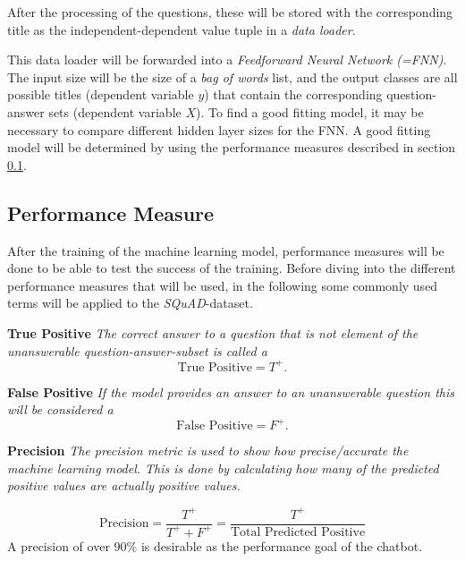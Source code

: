         After the processing of the questions, these will be stored with the corresponding title as the independent-dependent value tuple in a \emph{data loader}.

        This data loader will be forwarded into a \emph{Feedforward Neural Network (=FNN)}.
        The input size will be the size of a \emph{bag of words} list, and the output classes are all possible titles (dependent variable $y$) that contain the corresponding question-answer sets (dependent variable $X$). 
        To find a good fitting model, it may be necessary to compare different hidden layer sizes for the FNN.
        A good fitting model will be determined by using the performance measures described in section \ref{subsec:-the-learning-task---performance-measure}.


        
        
    \subsection{Performance Measure}
    \label{subsec:-the-learning-task---performance-measure}
    
        After the training of the machine learning model, performance measures will be done to be able to test the success of the training.
        Before diving into the different performance measures that will be used, in the following some commonly used terms will be applied to the \emph{SQuAD}-dataset.
        
        \begin{tcolorbox}
            \textbf{True Positive}
            \textit{The correct answer to a question that is not element of the unanswerable question-answer-subset is called a}
            $$\text{True Positive} = T^+.$$
        \end{tcolorbox}

        \begin{tcolorbox}
            \textbf{False Positive}
            \textit{If the model provides an answer to an unanswerable question this will be considered a}
            $$\text{False Positive} = F^+.$$
        \end{tcolorbox}

        \begin{tcolorbox}
            \textbf{Precision}
            \textit{The precision metric is used to show how precise/accurate the machine learning model. 
                This is done by calculating how many of the predicted positive values are actually positive values.
            }

            $$\text{Precision} = \frac{T^+}{T^+ + F^+} = \frac{T^+}{\text{Total Predicted Positive}}$$
            A precision of over $90\%$ is desirable as the performance goal of the chatbot.
        \end{tcolorbox}
        
